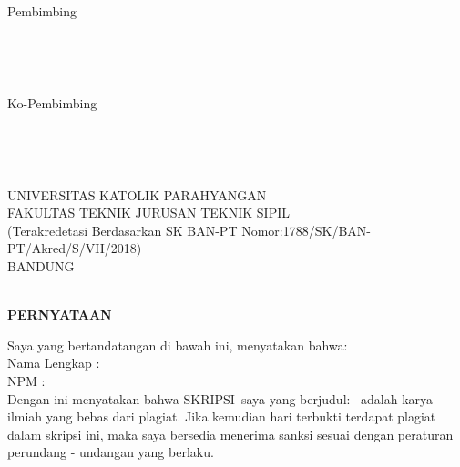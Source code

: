 \documentclass[11pt,a4paper,twoside,openright,notitlepage]{report}
\newcommand{\vstaINA}{SKRIPSI}
\begin{document}
{{{\begin{center}
{{\begin{center}
{\begin{center}
			    \vpembu\end{center}}
			{\begin{minipage}[b]{0.475\textwidth}
				 \begin{center}Pembimbing \\ 
				 {\begin{Form} \ \digsigfield{5cm}{2.5cm}{\vpembu}\ \end{Form}\\} 
				 \vpembu\end{center}
			 \end{minipage} \hspace{0.3cm}
			 \begin{minipage}[b]{0.475\textwidth}
				 \begin{center} Ko-Pembimbing \\
				 {\begin{Form} \ \digsigfield{5cm}{2.5cm}{\vpembs}\ \end{Form}\\}
				 \vpembs\end{center}
			 \end{minipage}	
			}
		\end{center}
		\vfill
		UNIVERSITAS KATOLIK PARAHYANGAN\\
		FAKULTAS TEKNIK JURUSAN TEKNIK SIPIL\\
		\small (Terakredetasi Berdasarkan SK BAN-PT Nomor:1788/SK/BAN-PT/Akred/S/VII/2018)\\
		BANDUNG\\
		\MakeUppercase{\vbulan}\ \vtahun 
		}}
	\end{center}
	\newpage
	
	\begin{center} 
		{\Large \textbf{PERNYATAAN}\\} \vspace{1cm}
	\end{center}
	\begin{flushleft}
Saya yang bertandatangan di bawah ini, menyatakan bahwa: \\\vspace{0.2cm}
Nama Lengkap : \vnama \\\vspace{0.2cm}
NPM \hspace{1.65cm}: \vnpm \\\vspace{0.2cm}
Dengan ini menyatakan bahwa \vstaINA\ saya yang berjudul: \vjudulINA\ adalah karya ilmiah yang bebas dari plagiat. Jika kemudian hari terbukti terdapat plagiat dalam skripsi ini, maka saya bersedia menerima sanksi sesuai dengan peraturan perundang - undangan yang berlaku. \\
	\vspace{0.25cm}
	\end{flushleft}
	
}}}
\end{document}
